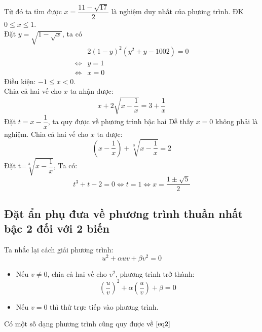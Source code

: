 Từ đó ta tìm được $x = \dfrac{{11 - \sqrt {17} }}{2}$ là nghiệm duy nhất của phương trình.
\hda ĐK $0 \le x \le 1$.\\
Đặt $y = \sqrt {1 - \sqrt x }$, ta có
\begin{align*}
& 2\left( {1 - y} \right)^2 \left( {y^2 + y - 1002} \right) = 0\\
 \Leftrightarrow & y = 1 \\
 \Leftrightarrow & x = 0
\end{align*} 
\hda
Điều kiện: $ - 1 \le x < 0$. \\Chia cả hai vế cho $x$ ta nhận được:
$$x + 2\sqrt {x - \dfrac{1}{x}} = 3 + \dfrac{1}{x}$$
Đặt $t = x - \dfrac{1}{x}$, ta quy được về phương trình bậc hai
\hda
Dễ thấy $x=0$ không phải là nghiệm. Chia cả hai vế cho $x$ ta được:
 $$\left( {x - \dfrac{1}{x}} \right) + \sqrt[3]{{x - \dfrac{1}{x}}} = 2$$
Đặt t=$\sqrt[3]{{x - \dfrac{1}{x}}}$, Ta có:  
$$t^3 + t - 2 = 0 \Leftrightarrow t = 1 \Leftrightarrow x = \dfrac{{1 \pm \sqrt 5 }}{2}$$
\subsection{Đặt ẩn phụ đưa về phương trình thuần nhất bậc 2 đối với 2 biến }
Ta nhắc lại cách giải phương trình: 
\begin{equation} \label{eq2}
u^2 + \alpha uv + \beta v^2 = 0
\end{equation}
\begin{itemize}
\item Nếu $v \neq 0$, chia cả hai vế cho $v^2$, phương trình trở thành:
 $$\left( {\dfrac{u}{v}} \right)^2 + \alpha \left( {\dfrac{u}{v}} \right) + \beta = 0$$
\item Nếu $v=0$ thì thử trực tiếp vào phương trình.
\end{itemize}
Có một số dạng phương trình cũng quy được về $\eqref{eq2}$
